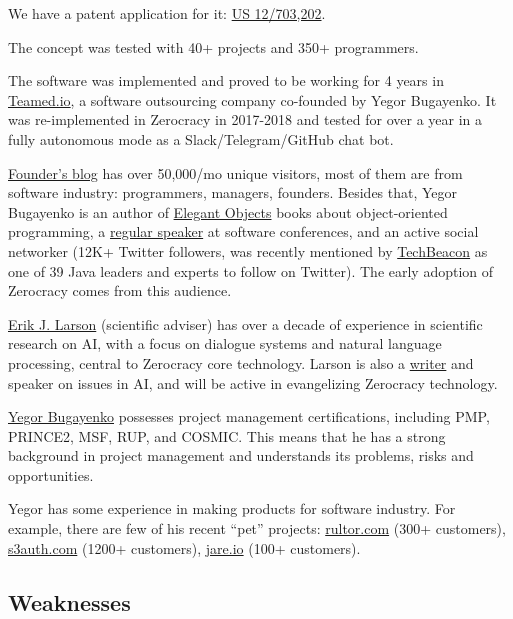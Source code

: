 \documentclass{main}
\begin{document}
We have a patent application for it:
\href{https://patents.google.com/patent/US20110196798}{US 12/703,202}.

The concept was tested with 40+ projects and 350+ programmers.

The software was implemented and proved to be working for 4 years in
\href{http://www.teamed.io}{Teamed.io},
a software outsourcing company co-founded by Yegor Bugayenko.
It was re-implemented in Zerocracy in 2017-2018 and tested for over a year
in a fully autonomous mode as a Slack/Telegram/GitHub chat bot.

\href{http://www.yegor256.com}{Founder's blog} has over 50,000/mo unique visitors, most of them are from
software industry: programmers, managers, founders. Besides that, Yegor
Bugayenko is an author of \href{https://amzn.to/2bYXQy7}{Elegant Objects} books about object-oriented
programming, a \href{https://lanyrd.com/profile/yegor256/}{regular speaker} at software conferences, and an active social
networker (12K+ Twitter followers, was recently mentioned by \href{https://techbeacon.com/java-leaders-you-should-follow-twitter}{TechBeacon} as one
of 39 Java leaders and experts to follow on Twitter). The
early adoption of Zerocracy comes from this audience.

\href{https://www.linkedin.com/in/erik-larson-b287ba9}{Erik J. Larson} (scientific adviser) has over a decade of experience in
scientific research on AI, with a focus on dialogue systems and natural language
processing, central to Zerocracy core technology. Larson is also a
\href{https://www.theatlantic.com/technology/archive/2015/05/the-humanists-paradox/391622/}{writer} and
speaker on issues in AI, and will be active in evangelizing Zerocracy
technology.

\href{http://www.yegor256.com/about-me.html}{Yegor Bugayenko} possesses project management certifications, including PMP,
PRINCE2, MSF, RUP, and COSMIC. This means that he has a strong background in
project management and understands its problems, risks and opportunities.

Yegor has some experience in making products for software industry. For example,
there are few of his recent ``pet'' projects:
\href{http://www.rultor.com}{rultor.com} (300+ customers),
\href{http://www.s3auth.com}{s3auth.com} (1200+ customers),
\href{http://www.jare.io}{jare.io} (100+ customers).

\subsection{Weaknesses}
\end{document}
